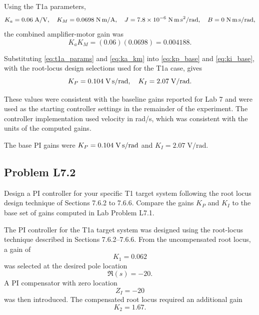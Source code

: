 \documentclass[10pt,twocolumn]{article}
\begin{document}
Using the T1a parameters,
\begin{equation}
K_a = 0.06\;\text{A/V},\quad
K_M = 0.0698\;\text{N\,m/A},\quad
J = 7.8\times10^{-6}\;\text{N\,m\,s}^2/\text{rad},\quad
B = 0\;\text{N\,m\,s/rad},
\label{eq:t1a_params}
\end{equation}
the combined amplifier-motor gain was
\begin{equation}
K_aK_M = (0.06)(0.0698) = 0.004188.
\label{eq:ka_km}
\end{equation}

Substituting \eqref{eq:t1a_params} and \eqref{eq:ka_km} into \eqref{eq:kp_base} and \eqref{eq:ki_base}, with the root-locus design selections used for the T1a case, gives
\begin{equation}
K_P = 0.104\;\text{V\,s/rad},\quad K_I = 2.07\;\text{V/rad}.
\label{eq:base_gains_result}
\end{equation}

These values were consistent with the baseline gains reported for Lab 7 and were used as the starting controller settings in the remainder of the experiment. The controller implementation used velocity in rad/s, which was consistent with the units of the computed gains.

\vspace{\baselineskip}

The base PI gains were $K_P = 0.104\;\text{V\,s/rad}$ and $K_I = 2.07\;\text{V/rad}$.

\subsection{Problem L7.2}
Design a PI controller for your specific T1 target system following the root locus design technique of Sections 7.6.2 to 7.6.6. Compare the gains $K_P$ and $K_I$ to the base set of gains computed in Lab Problem L7.1.

The PI controller for the T1a target system was designed using the root-locus technique described in Sections 7.6.2--7.6.6. From the uncompensated root locus, a gain of
\begin{equation}
K_1 = 0.062
\end{equation}
was selected at the desired pole location
\begin{equation}
\Re(s) = -20.
\end{equation}
A PI compensator with zero location
\begin{equation}
Z_I = -20
\end{equation}
was then introduced. The compensated root locus required an additional gain
\begin{equation}
K_2 = 1.67.
\end{equation}
\end{document}
